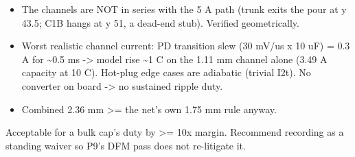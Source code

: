 \documentclass[11pt,a4paper]{article}
\begin{document}
\begin{itemize}
\item The channels are NOT in series with the 5 A path (trunk exits the pour at y 43.5;
C1B hangs at y 51, a dead-end stub). Verified geometrically.
\item Worst realistic channel current: PD transition slew (30 mV/us x 10 uF) = 0.3 A for
\textasciitilde{}0.5 ms -\textgreater{} model rise \textasciitilde{}1 C on the 1.11 mm channel alone (3.49 A capacity at 10 C).
Hot-plug edge cases are adiabatic (trivial I2t). No converter on board -\textgreater{} no
sustained ripple duty.
\item Combined 2.36 mm \textgreater{}= the net's own 1.75 mm rule anyway.
\end{itemize}
Acceptable for a bulk cap's duty by \textgreater{}= 10x margin. Recommend recording as a standing waiver so P9's DFM pass does not re-litigate it.
\end{document}
